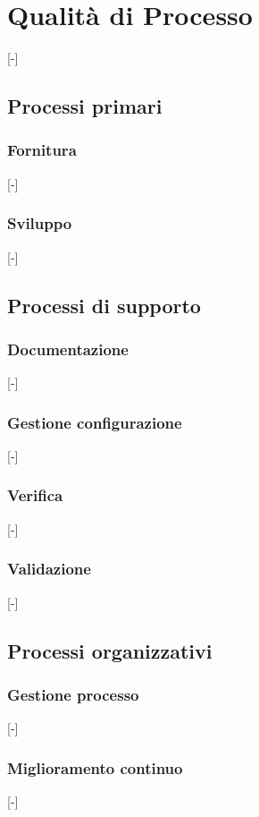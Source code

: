 \section{Qualità di Processo}
[-]

\subsection{Processi primari}
\subsubsection{Fornitura}
[-]
\subsubsection{Sviluppo}
[-]

\subsection{Processi di supporto}
\subsubsection{Documentazione}
[-]
\subsubsection{Gestione configurazione}
[-]
\subsubsection{Verifica}
[-]
\subsubsection{Validazione}
[-]

\subsection{Processi organizzativi}
\subsubsection{Gestione processo}
[-]
\subsubsection{Miglioramento continuo}
[-]

